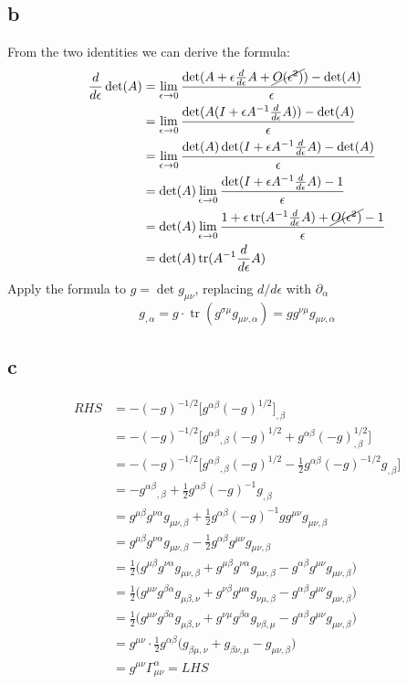 \documentclass{article}
\DeclareMathOperator{\tr}{tr}
\begin{document}
\subsection*{b}
From the two identities we can derive the formula:
\begin{align*} \frac{d}{d\epsilon}\det(A) &=  \lim_{\epsilon \rightarrow 0} \frac{\det(A + \epsilon \frac{d}{d\epsilon}A + \cancel{O(\epsilon^2)}) - \det(A)}{\epsilon}\\
	&= \lim_{\epsilon \rightarrow 0} \frac{\det(A(I + \epsilon A^{-1}\frac{d}{d\epsilon}A)) - \det(A)}{\epsilon} \\
	&=  \lim_{\epsilon \rightarrow 0} \frac{\det(A)\det(I + \epsilon A^{-1}\frac{d}{d\epsilon}A) - \det(A)}{\epsilon} \\
	&=  \det(A) \lim_{\epsilon \rightarrow 0} \frac{\det(I + \epsilon A^{-1}\frac{d}{d\epsilon}A) - 1}{\epsilon} \\
	&=  \det(A) \lim_{\epsilon \rightarrow 0} \frac{1 + \epsilon \tr(A^{-1}\frac{d}{d\epsilon}A) + \cancel{O(\epsilon^2)} - 1}{\epsilon} \\
	&=  \det(A) \tr(A^{-1}\frac{d}{d\epsilon}A)
\end{align*}
Apply the formula to $g = \det g_{\mu\nu}$, replacing $d/d\epsilon$ with $\partial_\alpha$
\[ g_{,\alpha} = g \cdot \tr(g^{\sigma\mu}g_{\mu\nu,\alpha}) = g g^{\nu\mu}g_{\mu\nu,\alpha} \]
\subsection*{c}
\begin{align*}
RHS &=-(-g)^{-1/2}\Big[g^{\alpha\beta}(-g)^{1/2}\Big]_{,\beta} \\
&= -(-g)^{-1/2}\Big[g^{\alpha\beta}{}_{,\beta}(-g)^{1/2} + g^{\alpha\beta}(-g)^{1/2}_{,\beta} \Big]\\
&= -(-g)^{-1/2}\Big[g^{\alpha\beta}{}_{,\beta}(-g)^{1/2} - \frac{1}{2}g^{\alpha\beta}(-g)^{-1/2}g_{,\beta} \Big]\\
&= - g^{\alpha\beta}{}_{,\beta} + \frac{1}{2}g^{\alpha\beta}(-g)^{-1}g_{,\beta}\\
&= g^{\mu\beta}g^{\nu\alpha}g_{\mu\nu,\beta} + \frac{1}{2}g^{\alpha\beta}(-g)^{-1}gg^{\mu\nu}g_{\mu\nu,\beta}\\
&= g^{\mu\beta}g^{\nu\alpha}g_{\mu\nu,\beta} - \frac{1}{2}g^{\alpha\beta}g^{\mu\nu}g_{\mu\nu,\beta}\\
&= \frac{1}{2}\Big(g^{\mu\beta}g^{\nu\alpha}g_{\mu\nu,\beta}  + g^{\mu\beta}g^{\nu\alpha}g_{\mu\nu,\beta} - g^{\alpha\beta}g^{\mu\nu}g_{\mu\nu,\beta} \Big) \\
&= \frac{1}{2}\Big(g^{\mu\nu}g^{\beta\alpha}g_{\mu\beta, \nu}  + g^{\nu\beta}g^{\mu\alpha}g_{\nu\mu,\beta} - g^{\alpha\beta}g^{\mu\nu}g_{\mu\nu,\beta} \Big) \\
&= \frac{1}{2}\Big(g^{\mu\nu}g^{\beta\alpha}g_{\mu\beta, \nu}  + g^{\nu\mu}g^{\beta\alpha}g_{\nu\beta,\mu} - g^{\alpha\beta}g^{\mu\nu}g_{\mu\nu,\beta} \Big) \\
&= g^{\mu\nu}\cdot \frac{1}{2}g^{\alpha\beta} \Big(g_{\beta\mu, \nu}  +g_{\beta\nu,\mu} - g_{\mu\nu,\beta} \Big)\\
&= g^{\mu\nu} \Gamma^\alpha_{\mu\nu} = LHS
\end{align*}
\end{document}
